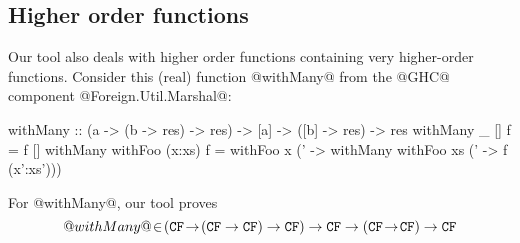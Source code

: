 \subsection{Higher order functions}

Our tool also deals with higher order functions containing
very higher-order functions. Consider this (real) function @withMany@ from the
@GHC@ component @Foreign.Util.Marshal@:

\begin{code}
withMany :: (a -> (b -> res) -> res)
         -> [a] -> ([b] -> res) -> res
withMany _       []     f = f []
withMany withFoo (x:xs) f = withFoo x (\x' ->
      withMany withFoo xs (\xs' -> f (x':xs')))
\end{code}

For @withMany@, our tool proves
$$
@withMany@\! \in \! ({\tt CF}\! \rightarrow\! ({\tt CF} \rightarrow {\tt CF}) \rightarrow {\tt CF}) \rightarrow {\tt CF} \rightarrow ({\tt CF} \! \rightarrow \! {\tt CF}) \rightarrow {\tt CF}
$$

